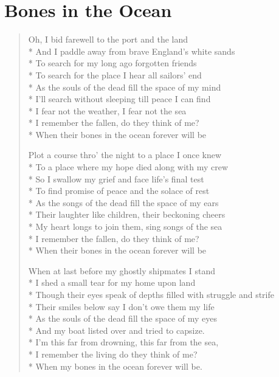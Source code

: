 \documentclass[9pt,twoside]{extarticle}
\newenvironment{xverse}{
	\begin{verse}
	\fontsize{8.5}{10.5}\selectfont
	}
	{
	\end{verse}
	\penalty 0
}
\begin{document}
\section{Bones in the Ocean}
\begin{xverse}
Oh, I bid farewell to the port and the land \\*
And I paddle away from brave England’s white sands \\*
To search for my long ago forgotten friends \\*
To search for the place I hear all sailors’ end \\*
As the souls of the dead fill the space of my mind \\*
I’ll search without sleeping till peace I can find \\*
I fear not the weather, I fear not the sea \\*
I remember the fallen, do they think of me? \\*
When their bones in the ocean forever will be

Plot a course thro’ the night to a place I once knew \\*
To a place where my hope died along with my crew \\*
So I swallow my grief and face life’s final test \\*
To find promise of peace and the solace of rest \\*
As the songs of the dead fill the space of my ears \\*
Their laughter like children, their beckoning cheers \\*
My heart longs to join them, sing songs of the sea \\*
I remember the fallen, do they think of me? \\*
When their bones in the ocean forever will be

When at last before my ghostly shipmates I stand \\*
I shed a small tear for my home upon land \\*
Though their eyes speak of depths filled with struggle and strife \\*
Their smiles below say I don’t owe them my life \\*
As the souls of the dead fill the space of my eyes \\*
And my boat listed over and tried to capsize. \\*
I’m this far from drowning, this far from the sea, \\*
I remember the living do they think of me? \\*
When my bones in the ocean forever will be.


\end{xverse}
\end{document}
